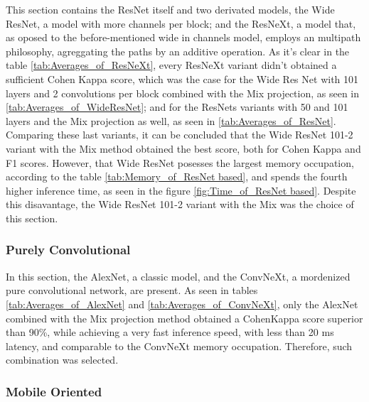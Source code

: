 This section contains the ResNet itself and two derivated models, the Wide ResNet, a model with more channels per block; and the ResNeXt, a model that, as oposed to the before-mentioned wide in channels model, employs an multipath philosophy, agreggating the paths by an additive operation. As it's clear in the table \ref{tab:Averages_of_ResNeXt}, every ResNeXt variant didn't obtained a sufficient Cohen Kappa score, which was the case for the Wide Res Net with 101 layers and 2 convolutions per block combined with the \acrshort{Mix} projection, as seen in \ref{tab:Averages_of_WideResNet}; and for the ResNets variants with 50 and 101 layers and the \acrshort{Mix} projection as well,  as seen in \ref{tab:Averages_of_ResNet}. Comparing these last variants, it can be concluded that the Wide ResNet 101-2 variant with the \acrshort{Mix} method obtained the best score, both for Cohen Kappa and F1 scores. However, that Wide ResNet posesses the largest memory occupation, according to the table \ref{tab:Memory_of_ResNet based}, and spends the fourth higher inference time, as seen in the figure \ref{fig:Time_of_ResNet based}.  Despite this disavantage, the Wide ResNet 101-2 variant with the \acrshort{Mix} was the choice of this section.

\pagebreak

\subsubsection{Purely Convolutional}






\pagebreak

In this section, the AlexNet, a classic model, and the ConvNeXt, a mordenized pure convolutional network, are present. As seen in tables \ref{tab:Averages_of_AlexNet} and \ref{tab:Averages_of_ConvNeXt}, only the AlexNet combined with the \acrshort{Mix} projection method obtained a CohenKappa score superior than 90\%, while achieving a very fast inference speed, with less than 20 ms latency, and comparable to the ConvNeXt memory occupation. Therefore, such combination was selected.  

\pagebreak

\subsubsection{Mobile Oriented}

